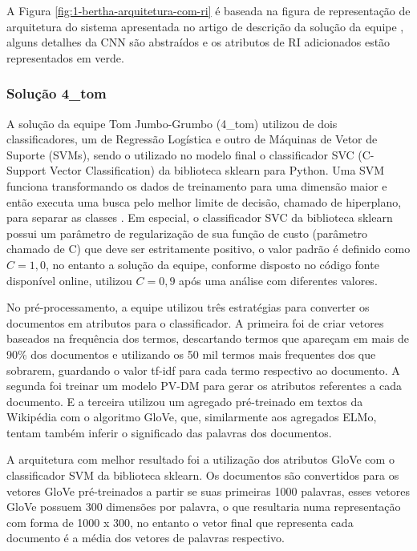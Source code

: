 				

				A Figura \ref{fig:1-bertha-arquitetura-com-ri} é baseada na figura de representação de arquitetura do sistema apresentada no artigo de descrição da solução da equipe \cite{jiang-etal-2019-team}, alguns detalhes da CNN são abstraídos e os atributos de RI adicionados estão representados em verde.


			\subsubsection{Solução 4\_tom}
				A solução da equipe Tom Jumbo-Grumbo (4\_tom) utilizou de dois classificadores, um de Regressão Logística e outro de Máquinas de Vetor de Suporte (SVMs), sendo o utilizado no modelo final o classificador SVC (C-Support Vector Classification) da biblioteca sklearn para Python.
				Uma SVM funciona transformando os dados de treinamento para uma dimensão maior e então executa uma busca pelo melhor limite de decisão, chamado de hiperplano, para separar as classes \cite[p.~408]{Han:2011:DMC:1972541}.
				Em especial, o classificador SVC da biblioteca sklearn possui um parâmetro de regularização de sua função de custo (parâmetro chamado de C) que deve ser estritamente positivo, o valor padrão é definido como $C = 1,0$, no entanto a solução da equipe, conforme disposto no código fonte disponível online, utilizou $C = 0,9$ após uma análise com diferentes valores.

				No pré-processamento, a equipe utilizou três estratégias para converter os documentos em atributos para o classificador.
				A primeira foi de criar vetores baseados na frequência dos termos, descartando termos que apareçam em mais de 90\% dos documentos e utilizando os 50 mil termos mais frequentes dos que sobrarem, guardando o valor tf-idf para cada termo respectivo ao documento.
				A segunda foi treinar um modelo PV-DM para gerar os atributos referentes a cada documento.
				E a terceira utilizou um agregado pré-treinado em textos da Wikipédia com o algoritmo GloVe, que, similarmente aos agregados ELMo, tentam também inferir o significado das palavras dos documentos.

				A arquitetura com melhor resultado foi a utilização dos atributos GloVe com o classificador SVM da biblioteca sklearn.
				Os documentos são convertidos para os vetores GloVe pré-treinados a partir se suas primeiras 1000 palavras, esses vetores GloVe possuem 300 dimensões por palavra, o que resultaria numa representação com forma de 1000 x 300, no entanto o vetor final que representa cada documento é a média dos vetores de palavras respectivo.

